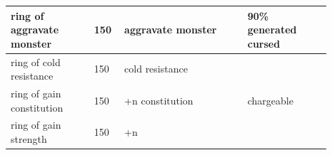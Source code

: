 \begin{longtable}{|>{\RaggedRight}p{0.23487\linewidth}|>{\RaggedRight}p{0.07372\linewidth}|>{\RaggedRight}p{0.34225\linewidth}|>{\RaggedRight}p{0.23487\linewidth}|}
\hspace*{0pt}\ignorespaces{}\hspace*{0pt}ring of aggravate monster\footnotemark[62]&\hspace*{0pt}\ignorespaces{}\hspace*{0pt}150&\hspace*{0pt}\ignorespaces{}\hspace*{0pt}aggravate monster\footnotemark[63]&\hspace*{0pt}\ignorespaces{}\hspace*{0pt}90\% generated cursed\\ \hline \hspace*{0pt}\ignorespaces{}\hspace*{0pt}ring of cold resistance\footnotemark[64]&\hspace*{0pt}\ignorespaces{}\hspace*{0pt}150&\hspace*{0pt}\ignorespaces{}\hspace*{0pt}cold resistance\footnotemark[65]&\hspace*{0pt}\ignorespaces{}\hspace*{0pt}\\ \hline \hspace*{0pt}\ignorespaces{}\hspace*{0pt}ring of gain constitution\footnotemark[66]&\hspace*{0pt}\ignorespaces{}\hspace*{0pt}150&\hspace*{0pt}\ignorespaces{}\hspace*{0pt}+n constitution\footnotemark[67]&\hspace*{0pt}\ignorespaces{}\hspace*{0pt}chargeable\\ \hline \hspace*{0pt}\ignorespaces{}\hspace*{0pt}ring of gain strength\footnotemark[68]&\hspace*{0pt}\ignorespaces{}\hspace*{0pt}150&\hspace*{0pt}\ignorespaces{}\hspace*{0pt}+n 
\end{longtable}
